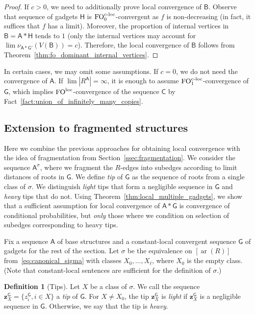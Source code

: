 \documentclass[11pt]{article}
\theoremstyle{plain}
\theoremstyle{definition}
\newtheorem{definition}{Definition}
\theoremstyle{remark}
\DeclareMathOperator\aritysym{ar}
\newcommand{\arity}[1]{{\aritysym({#1})}}
\DeclareMathOperator\FO{FO}
\newcommand{\FOloc}[1]{\FO_{#1}^\textnormal{loc}}
\newcommand{\FOcloc}[1]{\FO_{#1}^{\textnormal{c-loc}}}
\newcommand{\strseq}[1]{{\boldsymbol{\mathsf{#1}}}}
\newcommand{\tpl}[1]{{\bm{#1}}}
\begin{document}
\begin{proof}
    If $c > 0$, we need to additionally prove local convergence of $\strseq{B}$.
    Observe that sequence of gadgets $\strseq{H}$ is $\FOcloc{0}$-convergent as $f$ is non-decreasing (in fact, it suffices that $f$ has a limit).
    Moreover, the proportion of internal vertices in $\strseq{B} = \strseq{A}*\strseq{H}$ tends to $1$ (only the internal vertices may account for $\lim \nu_{\strseq{A}*\strseq{G}'}(V(\strseq{B})) = c$).
    Therefore, the local convergence of $\strseq{B}$ follows from Theorem~\ref{thm:fo_dominant_internal_vertices}.
\end{proof}

In certain cases, we may omit some assumptions.
If $c = 0$, we do not need the convergence of $\strseq{A}$.
If $\lim |R^\strseq{A}| = \infty$, it is enough to assume $\FOcloc{1}$-convergence of $\strseq{G}$, which implies $\FOloc{}$-convergence of the sequence $\strseq{C}$ by Fact~\ref{fact:union_of_infinitely_many_copies}.

\subsection{Extension to fragmented structures}\label{ssec:extension_to_fragmented_structures}

Here we combine the previous approaches for obtaining local convergence with the idea of fragmentation from Section~\ref{ssec:fragmentation}.
We consider the sequence $\strseq{A}^\sigma$, where we fragment the $R$-edges into subedges according to limit distances of roots in $\strseq{G}$.
We define \emph{tip} of $\strseq{G}$ as the sequence of roots from a single class of $\sigma$.
We distinguish \emph{light} tips that form a negligible sequence in $\strseq{G}$ and \emph{heavy} tips that do not.
Using Theorem~\ref{thm:local_multiple_gadgets}, we show that a sufficient assumption for local convergence of $\strseq{A}*\strseq{G}$ is convergence of conditional probabilities, but \emph{only} those where we condition on selection of subedges corresponding to heavy tips.

Fix a sequence $\strseq{A}$ of base structures and a constant-local convergent sequence $\strseq{G}$ of gadgets for the rest of the section.
Let $\sigma$ be the equivalence on $[\arity{R}]$ from~\eqref{eq:canonical_sigma} with classes $X_0, \dots, X_\ell$, where $X_0$ is the empty class.
(Note that constant-local sentences are sufficient for the definition of $\sigma$.)

\begin{definition}[Tips]
    Let $X$ be a class of $\sigma$.
    We call the sequence $\tpl{z}^\strseq{G}_X = \{z^\strseq{G}_i, i \in X\}$ a \emph{tip} of $\strseq{G}$.
    For $X \not= X_0$, the tip $\tpl{z}^\strseq{G}_X$ is \emph{light} if $\tpl{z}^\strseq{G}_X$ is a negligible sequence in $\strseq{G}$.
    Otherwise, we say that the tip is \emph{heavy}.
\end{definition}
\end{document}
